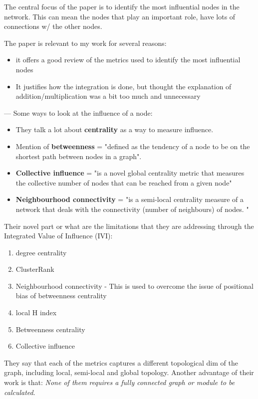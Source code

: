 The central focus of the paper is to identify the most influential nodes in the network. This can mean the nodes that play an important role, have lots of connections w/ the other nodes. 

The paper is relevant to my work for several reasons:
\begin{itemize}
    \item it offers a good review of the metrics used to identify the most influential nodes
    \item  It justifies how the integration is done, but thought the explanation of addition/multiplication was a bit too much and unnecessary
\end{itemize}

--- 
Some ways to look at the influence of a node: 

\begin{itemize}
    \item They talk a lot about \textbf{centrality} as a way to measure influence.
    \item Mention of \textbf{betweenness} = "defined as the tendency of a node to be on the shortest path between nodes in a graph".
    \item \textbf{Collective influence} =  "is a novel global centrality metric that measures the collective number of nodes that can be reached from a given node" 
    \item\textbf{ Neighbourhood connectivity} = "is a semi-local centrality measure of a network that deals with the connectivity (number of neighbours) of nodes. "

\end{itemize}

Their novel part or what are the limitations that they are addressing through the Integrated Value of Influence (IVI):

\begin{enumerate}
    \item degree centrality 
    \item ClusterRank
    \item Neighbourhood connectivity - This is used to overcome the issue of positional bias of betweenness centrality
    \item local H index
    \item Betweenness centrality  
    \item Collective influence 
\end{enumerate}


They say that each of the metrics captures a different topological dim of the graph, including local, semi-local and global topology. Another advantage of their work is that: \textit{None of them requires a fully connected graph or module to be calculated}.



\newpage


 



